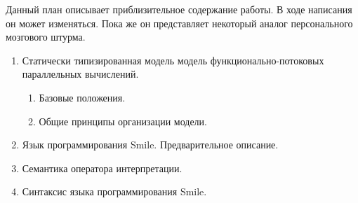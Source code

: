 Данный план описывает приблизительное содержание работы. В ходе написания он может изменяться. Пока же он представляет некоторый аналог персонального мозгового штурма.

\begin{enumerate}
	 \item  Статически типизированная модель модель функционально-потоковых параллельных вычислений.
 	\begin{enumerate}
   		\item Базовые положения.
   		\item Общие принципы организации модели.
  	\end{enumerate}
   	\item Язык программирования Smile. Предварительное описание.
	\item Семантика оператора интерпретации.
	\item Синтаксис языка программирования Smile.
\end{enumerate}

